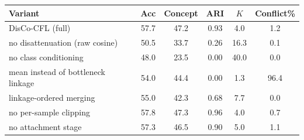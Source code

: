 \scriptsize
\begin{tabular}{lccccc}
\toprule
Variant & Acc & Concept & ARI & $K$ & Conflict\% \\
\midrule
DisCo-CFL (full) & 57.7 & 47.2 & 0.93 & 4.0 & 1.2 \\
no disattenuation (raw cosine) & 50.5 & 33.7 & 0.26 & 16.3 & 0.1 \\
no class conditioning & 48.0 & 23.5 & 0.00 & 40.0 & 0.0 \\
mean instead of bottleneck linkage & 54.0 & 44.4 & 0.00 & 1.3 & 96.4 \\
linkage-ordered merging & 55.0 & 42.3 & 0.68 & 7.7 & 0.0 \\
no per-sample clipping & 57.8 & 47.3 & 0.96 & 4.0 & 0.7 \\
no attachment stage & 57.3 & 46.5 & 0.90 & 5.0 & 1.1 \\
\bottomrule
\end{tabular}
